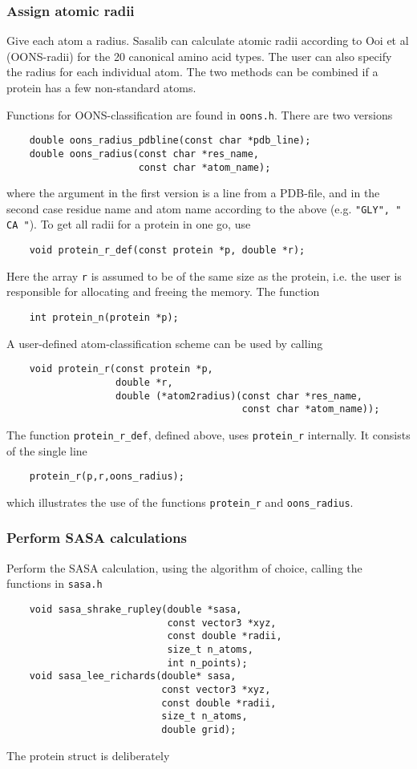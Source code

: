 \documentclass[a4paper,11pt]{article}
\begin{document}
\subsubsection{Assign atomic radii}
Give each atom a radius. Sasalib can calculate atomic radii according
to Ooi et al (OONS-radii) for the 20 canonical amino acid types. The
user can also specify the radius for each individual atom. The two
methods can be combined if a protein has a few non-standard atoms.

Functions for OONS-classification are found in \texttt{oons.h}. There
are two versions
\begin{verbatim}
    double oons_radius_pdbline(const char *pdb_line);
    double oons_radius(const char *res_name,
                       const char *atom_name);
\end{verbatim}
where the argument in the first version is a line from a PDB-file, and
in the second case residue name and atom name according to the above
(e.g. \texttt{"GLY", " CA "}). To get all radii for a protein in one
go, use
\begin{verbatim}
    void protein_r_def(const protein *p, double *r);
\end{verbatim} 
Here the array \texttt{r} is assumed to be of the same size as the
protein, i.e. the user is responsible for allocating and freeing the
memory. The function
\begin{verbatim}
    int protein_n(protein *p);
\end{verbatim}
A user-defined atom-classification scheme can be used by calling 
\begin{verbatim}
    void protein_r(const protein *p, 
                   double *r,
                   double (*atom2radius)(const char *res_name, 
                                         const char *atom_name));
\end{verbatim}
The function \texttt{protein\_r\_def}, defined above, uses
\texttt{protein\_r} internally. It consists of the single line
\begin{verbatim}
    protein_r(p,r,oons_radius);
\end{verbatim}
which illustrates the use of the functions \texttt{protein\_r} and
\texttt{oons\_radius}.

\subsubsection{Perform SASA calculations}
Perform the SASA calculation, using the algorithm of choice, calling
the functions in \texttt{sasa.h}
\begin{verbatim}
    void sasa_shrake_rupley(double *sasa,
                            const vector3 *xyz,
                            const double *radii,
                            size_t n_atoms,
                            int n_points);
    void sasa_lee_richards(double* sasa,
                           const vector3 *xyz,
                           const double *radii,
                           size_t n_atoms,
                           double grid);

\end{verbatim}
The protein struct is deliberately
\end{document}
